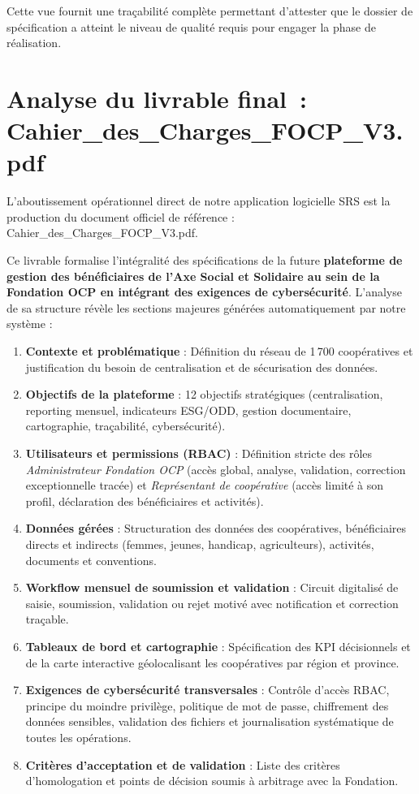Cette vue fournit une traçabilité complète permettant d'attester que le dossier de spécification a atteint le niveau de qualité requis pour engager la phase de réalisation.

\section[Analyse du livrable final : Cahier des Charges FOCP V3]{Analyse du livrable final~: {\ttfamily Cahier\allowbreak\_\allowbreak des\allowbreak\_\allowbreak Charges\allowbreak\_\allowbreak FOCP\allowbreak\_\allowbreak V3.pdf}}

L'aboutissement opérationnel direct de notre application logicielle SRS est la production du document officiel de référence : {\ttfamily Cahier\allowbreak\_\allowbreak des\allowbreak\_\allowbreak Charges\allowbreak\_\allowbreak FOCP\allowbreak\_\allowbreak V3.pdf}.

Ce livrable formalise l'intégralité des spécifications de la future \textbf{plateforme de gestion des bénéficiaires de l'Axe Social et Solidaire au sein de la Fondation OCP en intégrant des exigences de cybersécurité}. L'analyse de sa structure révèle les sections majeures générées automatiquement par notre système :
\begin{enumerate}
    \item \textbf{Contexte et problématique} : Définition du réseau de 1\,700 coopératives et justification du besoin de centralisation et de sécurisation des données.
    \item \textbf{Objectifs de la plateforme} : 12 objectifs stratégiques (centralisation, reporting mensuel, indicateurs ESG/ODD, gestion documentaire, cartographie, traçabilité, cybersécurité).
    \item \textbf{Utilisateurs et permissions (RBAC)} : Définition stricte des rôles \textit{Administrateur Fondation OCP} (accès global, analyse, validation, correction exceptionnelle tracée) et \textit{Représentant de coopérative} (accès limité à son profil, déclaration des bénéficiaires et activités).
    \item \textbf{Données gérées} : Structuration des données des coopératives, bénéficiaires directs et indirects (femmes, jeunes, handicap, agriculteurs), activités, documents et conventions.
    \item \textbf{Workflow mensuel de soumission et validation} : Circuit digitalisé de saisie, soumission, validation ou rejet motivé avec notification et correction traçable.
    \item \textbf{Tableaux de bord et cartographie} : Spécification des KPI décisionnels et de la carte interactive géolocalisant les coopératives par région et province.
    \item \textbf{Exigences de cybersécurité transversales} : Contrôle d'accès RBAC, principe du moindre privilège, politique de mot de passe, chiffrement des données sensibles, validation des fichiers et journalisation systématique de toutes les opérations.
    \item \textbf{Critères d'acceptation et de validation} : Liste des critères d'homologation et points de décision soumis à arbitrage avec la Fondation.
\end{enumerate}

